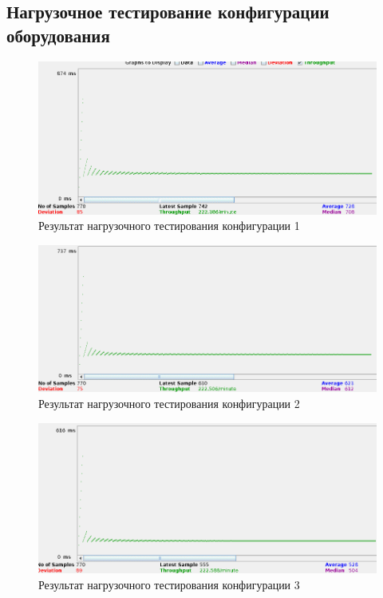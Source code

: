 \documentclass[a4paper,10pt]{article}
\begin{document}
	\subsection*{Нагрузочное тестирование конфигурации оборудования}
		\begin{figure}[h!]
			\includegraphics[scale=0.5]{./img/loadtest_conf1.png}
			\caption{Результат нагрузочного тестирования конфигурации 1}
		\end{figure}

		\begin{figure}[h!]
			\includegraphics[scale=0.5]{./img/loadtest_conf2.png}
			\caption{Результат нагрузочного тестирования конфигурации 2}
		\end{figure}

		\begin{figure}[h!]
			\includegraphics[scale=0.5]{./img/loadtest_conf3.png}
			\caption{Результат нагрузочного тестирования конфигурации 3}
		\end{figure}
\end{document}
